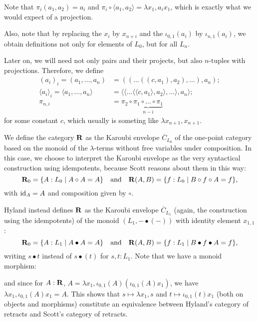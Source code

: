 Note that $ \pi_i (a_1, a_2) = a_i $ and $ \pi_i \circ \langle a_1, a_2 \rangle = \lambda x_1, a_i x_1 $, which is exactly what we would expect of a projection.

Also, note that by replacing the $ x_i $ by $ x_{n + i} $ and the $ \iota_{0, 1}(a_i) $ by $ \iota_{n, 1}(a_i) $, we obtain definitions not only for elements of $ L_0 $, but for all $ L_n $.

Later on, we will need not only pairs and their projects, but also $ n $-tuples with projections. Therefore, we define
\begin{align*}
  (a_i)_i = (a_1, \dots, a_n) &= ((\dots((c, a_1), a_2), \dots), a_n);\\
  \langle a_i \rangle_i = \langle a_1, \dots, a_n \rangle &= \langle\langle\dots\langle\langle c, a_1\rangle, a_2\rangle, \dots\rangle, a_n\rangle;\\
  \pi_{n, i} &= \pi_2 \circ \underbrace{\pi_1 \circ \dots \circ \pi_1}_{n - i}
\end{align*}
for some constant $ c $, which usually is someting like $ \lambda x_{n + 1}, x_{n + 1} $.

\begin{definition}
  We define the category $ \mathbf{R} $ as the Karoubi envelope $ \overline C_{L_0} $ of the one-point category based on the monoid of the $ \lambda $-terms without free variables under composition. In this case, we choose to interpret the Karoubi envelope as the very syntactical construction using idempotents, because Scott reasons about them in this way:
  \[ \mathbf{R}_0 = \{ A : L_0 \mid A \circ A = A \} \quad \text{and} \quad \mathbf{R}(A, B) = \{ f: L_0 \mid B \circ f \circ A = f \}, \]
  with $ \text{id}_{A} = A $ and composition given by $ \circ $.
\end{definition}

\begin{remark}
  Hyland instead defines $ \mathbf{R} $ as the Karoubi envelope $ \overline C_{L_1} $ (again, the construction using the idempotents) of the monoid $ (L_1, - \bullet (-)) $ with identity element $ x_{1, 1} $:
  \[ \mathbf{R}_0 = \{ A : L_1 \mid A \bullet A = A \} \quad \text{and} \quad \mathbf{R}(A, B) = \{ f : L_1 \mid B \bullet f \bullet A = f \}, \]
  writing $ s \bullet t $ instead of $ s \bullet (t) $ for $ s, t : L_1 $. Note that we have a monoid morphism:
  \begin{center}
  \end{center}
  and since for $ A : \mathbf{R} $, $ A = \lambda x_1, \iota_{0, 1}(A) (\iota_{0, 1}(A) x_1) $, we have $ \lambda x_1, \iota_{0, 1}(A) x_1 = A $. This shows that $ s \mapsto \lambda x_1, s $ and $ t \mapsto \iota_{0, 1}(t) x_1 $ (both on objects and morphisms) constitute an equivalence between Hyland's category of retracts and Scott's category of retracts.
\end{remark}

